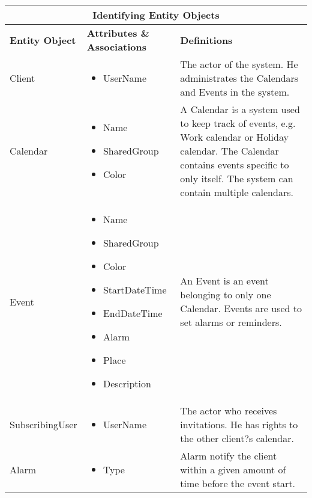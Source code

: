 \begin{tabular}{|l|p{5.3cm}|p{5.3cm}|}
\hline
\multicolumn{3}{|c|}{Identifying Entity Objects} \\
\hline
\textbf{Entity Object} & \textbf{Attributes \& Associations} & \textbf{Definitions} \\
\hline
 Client & 
\begin{itemize}
     \item UserName
\end{itemize} &
The actor of the system. He administrates the Calendars and Events in the system. \\ \hline
Calendar & 
\begin{itemize}
	\item Name
	\item SharedGroup
	\item Color
  \end{itemize} & 
A Calendar is a system used to keep track of events, e.g. Work calendar or Holiday calendar. The Calendar contains events specific to only itself. The system can contain multiple calendars.\\ \hline
Event &
\begin{itemize}
	\item Name
	\item SharedGroup
	\item Color
	\item StartDateTime
	\item EndDateTime
	\item Alarm
	\item Place
	\item Description
\end{itemize} &
An Event is an event belonging to only one Calendar. Events are used to set alarms or reminders. \\ \hline
SubscribingUser & 
\begin{itemize} 
	\item UserName 
\end{itemize} & 
The actor who receives invitations. He has rights to the other client?s calendar. \\ \hline
Alarm &
\begin{itemize} 
	\item Type
\end{itemize} &
Alarm notify the client within a given amount of time before the event start.  \\ \hline
\end{tabular}